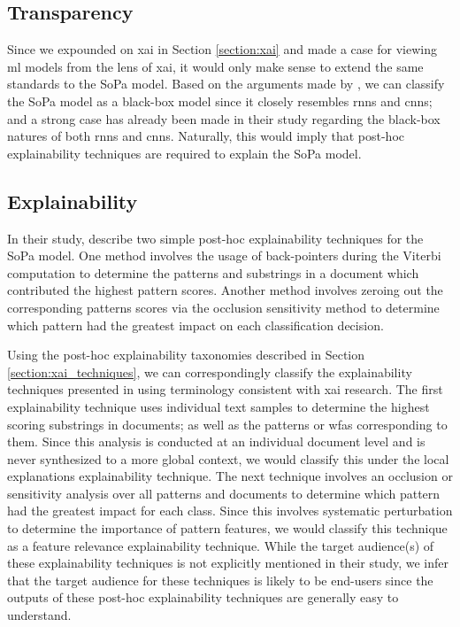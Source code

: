 \subsection{Transparency}

\label{section:sopa_transparency}

Since we expounded on \ac{xai} in Section \ref{section:xai} and made a case for
viewing \ac{ml} models from the lens of \ac{xai}, it would only make sense to extend the
same standards to the SoPa model. Based on the arguments made by
\citet{arrieta2020explainable}, we can classify the SoPa model as a black-box
model since it closely resembles \ac{rnn}s and \ac{cnn}s; and a strong case has already
been made in their study regarding the black-box natures of both \ac{rnn}s and \ac{cnn}s.
Naturally, this would imply that post-hoc explainability techniques are required to
explain the SoPa model.

\subsection{Explainability}

\label{section:sopa_post_hoc}

In their study, \citet[Page 7, Section 7]{schwartz2018sopa} describe two simple
post-hoc explainability techniques for the SoPa model. One method involves the
usage of back-pointers during the Viterbi computation to determine the patterns
and substrings in a document which contributed the highest pattern scores.
Another method involves zeroing out the corresponding patterns scores via the
occlusion sensitivity method to determine which pattern had the greatest impact
on each classification decision.

Using the post-hoc explainability taxonomies described in Section
\ref{section:xai_techniques}, we can correspondingly classify the explainability
techniques presented in \citet{schwartz2018sopa} using terminology consistent with
\ac{xai} research. The first explainability technique uses individual text samples to
determine the highest scoring substrings in documents; as well as the patterns
or \ac{wfas} corresponding to them. Since this analysis is conducted at an individual
document level and is never synthesized to a more global context, we would
classify this under the local explanations explainability technique. The next
technique involves an occlusion or sensitivity analysis over all patterns and
documents to determine which pattern had the greatest impact for each class.
Since this involves systematic perturbation to determine the importance of
pattern features, we would classify this technique as a feature relevance
explainability technique. While the target audience(s) of these
explainability techniques is not explicitly mentioned in their study, we infer that
the target audience for these techniques is likely to be end-users since the
outputs of these post-hoc explainability techniques are generally easy to understand.

